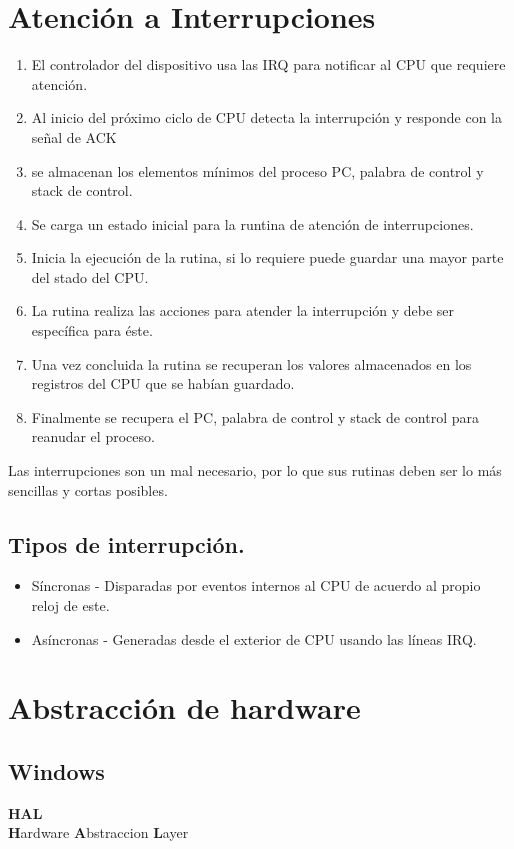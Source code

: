 \newpage
\part{Atenci\'{o}n a Interrupciones}

\begin{enumerate}
	\item El controlador del dispositivo usa las IRQ para notificar al CPU que requiere atenci\'{o}n.
	\item Al inicio del pr\'{o}ximo ciclo de CPU detecta la interrupci\'{o}n y responde con la se\~{n}al de ACK
	\item se almacenan los elementos m\'{i}nimos del proceso PC, palabra de control y stack de control.
	\item Se carga un estado inicial para la runtina de atenci\'{o}n de interrupciones.
	\item Inicia la ejecuci\'{o}n de la rutina, si lo requiere puede guardar una mayor parte del stado del CPU.
	\item La rutina realiza las acciones para atender la interrupci\'{o}n y debe ser espec\'{i}fica para \'{e}ste.
	\item Una vez concluida la rutina se recuperan los valores almacenados en los registros del CPU que se hab\'{i}an guardado.
	\item Finalmente se recupera el PC, palabra de control y stack de control para reanudar el proceso.
\end{enumerate}
Las interrupciones son un mal necesario, por lo que sus rutinas deben ser lo m\'{a}s sencillas y cortas posibles.

\chapter{Tipos de interrupci\'{o}n.}

\begin{itemize}
	\item S\'{i}ncronas - Disparadas por eventos internos al CPU de acuerdo al propio reloj de este.
	\item As\'{i}ncronas - Generadas desde el exterior de CPU usando las l\'{i}neas IRQ.
\end{itemize}

\part{Abstracci\'{o}n de hardware}
\chapter{Windows}
\textbf{HAL}\\
\textbf{H}ardware \textbf{A}bstraccion \textbf{L}ayer\\
